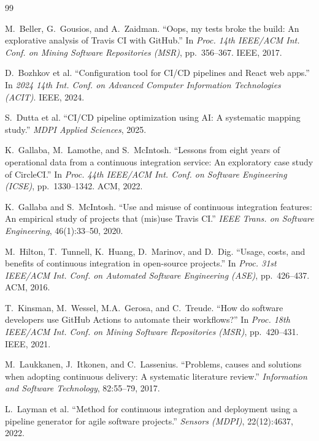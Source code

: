 \documentclass[12pt, a4paper]{article}
\begin{document}
\begin{thebibliography}{99}

M.~Beller, G.~Gousios, and A.~Zaidman.
``Oops, my tests broke the build: An explorative analysis of Travis CI with GitHub.''
In \emph{Proc. 14th IEEE/ACM Int. Conf. on Mining Software Repositories (MSR)},
pp.~356--367. IEEE, 2017.

D.~Bozhkov et al.
``Configuration tool for CI/CD pipelines and React web apps.''
In \emph{2024 14th Int. Conf. on Advanced Computer Information Technologies (ACIT)}.
IEEE, 2024.

S.~Dutta et al.
``CI/CD pipeline optimization using AI: A systematic mapping study.''
\emph{MDPI Applied Sciences}, 2025.

K.~Gallaba, M.~Lamothe, and S.~McIntosh.
``Lessons from eight years of operational data from a continuous integration service:
An exploratory case study of CircleCI.''
In \emph{Proc. 44th IEEE/ACM Int. Conf. on Software Engineering (ICSE)},
pp.~1330--1342. ACM, 2022.

K.~Gallaba and S.~McIntosh.
``Use and misuse of continuous integration features: An empirical study of projects
that (mis)use Travis CI.''
\emph{IEEE Trans. on Software Engineering}, 46(1):33--50, 2020.

M.~Hilton, T.~Tunnell, K.~Huang, D.~Marinov, and D.~Dig.
``Usage, costs, and benefits of continuous integration in open-source projects.''
In \emph{Proc. 31st IEEE/ACM Int. Conf. on Automated Software Engineering (ASE)},
pp.~426--437. ACM, 2016.

T.~Kinsman, M.~Wessel, M.A.~Gerosa, and C.~Treude.
``How do software developers use GitHub Actions to automate their workflows?''
In \emph{Proc. 18th IEEE/ACM Int. Conf. on Mining Software Repositories (MSR)},
pp.~420--431. IEEE, 2021.

M.~Laukkanen, J.~Itkonen, and C.~Lassenius.
``Problems, causes and solutions when adopting continuous delivery: A systematic
literature review.''
\emph{Information and Software Technology}, 82:55--79, 2017.

L.~Layman et al.
``Method for continuous integration and deployment using a pipeline generator for
agile software projects.''
\emph{Sensors (MDPI)}, 22(12):4637, 2022.


\end{thebibliography}
\end{document}
